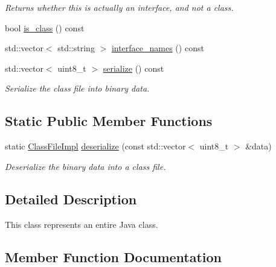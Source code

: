 \begin{DoxyCompactItemize}
\begin{DoxyCompactList}\small\item\em Returns whether this is actually an interface, and not a class. \end{DoxyCompactList}\item 
bool \hyperlink{classClassFileImpl_a3772a57b8eaadf252a9a9f36c063ab93}{is\+\_\+class} () const
\item 
std\+::vector$<$ std\+::string $>$ \hyperlink{classClassFileImpl_ad2154cb52119b87cd74b722b69730dee}{interface\+\_\+names} () const
\item 
\mbox{\label{classClassFileImpl_a4e2a4657d4b102369ba7305251d41d00}} 
std\+::vector$<$ uint8\+\_\+t $>$ \hyperlink{classClassFileImpl_a4e2a4657d4b102369ba7305251d41d00}{serialize} () const
\begin{DoxyCompactList}\small\item\em Serialize the class file into binary data. \end{DoxyCompactList}\end{DoxyCompactItemize}
\subsection*{Static Public Member Functions}
\begin{DoxyCompactItemize}
\item 
\mbox{\label{classClassFileImpl_abdfa46cef80b0ec30115f1c0c9bb1db6}} 
static \hyperlink{classClassFileImpl}{Class\+File\+Impl} \hyperlink{classClassFileImpl_abdfa46cef80b0ec30115f1c0c9bb1db6}{deserialize} (const std\+::vector$<$ uint8\+\_\+t $>$ \&data)
\begin{DoxyCompactList}\small\item\em Deserialize the binary data into a class file. \end{DoxyCompactList}\end{DoxyCompactItemize}


\subsection{Detailed Description}
This class represents an entire Java class. 

\subsection{Member Function Documentation}
\mbox{\label{classClassFileImpl_abf8923075c93d6d5bd1755a7b3ced362}} 
